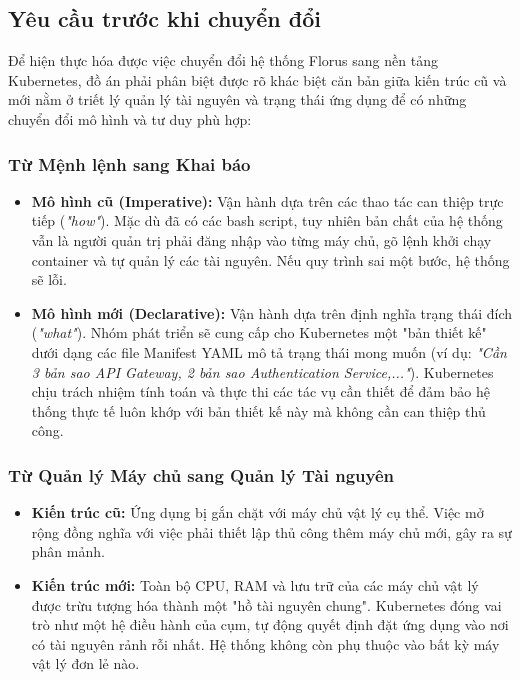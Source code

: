\subsection{Yêu cầu trước khi chuyển đổi}

Để hiện thực hóa được việc chuyển đổi hệ thống Florus sang nền tảng Kubernetes, đồ án phải phân biệt được rõ khác biệt căn bản giữa kiến trúc cũ và mới nằm ở triết lý quản lý tài nguyên và trạng thái ứng dụng để có những chuyển đổi mô hình và tư duy phù hợp:

\subsubsection{Từ Mệnh lệnh sang Khai báo} 
\begin{itemize} 
    \item \textbf{Mô hình cũ (Imperative):} Vận hành dựa trên các thao tác can thiệp trực tiếp (\textit{"how"}). Mặc dù đã có các bash script, tuy nhiên bản chất của hệ thống vẫn là người quản trị phải đăng nhập vào từng máy chủ, gõ lệnh khởi chạy container và tự quản lý các tài nguyên. Nếu quy trình sai một bước, hệ thống sẽ lỗi. 
    \item \textbf{Mô hình mới (Declarative):} Vận hành dựa trên định nghĩa trạng thái đích (\textit{"what"}). Nhóm phát triển sẽ cung cấp cho Kubernetes một "bản thiết kế" dưới dạng các file Manifest YAML mô tả trạng thái mong muốn (ví dụ: \textit{"Cần 3 bản sao API Gateway, 2 bản sao Authentication Service,..."}). Kubernetes chịu trách nhiệm tính toán và thực thi các tác vụ cần thiết để đảm bảo hệ thống thực tế luôn khớp với bản thiết kế này mà không cần can thiệp thủ công. 
\end{itemize}

\subsubsection{Từ Quản lý Máy chủ sang Quản lý Tài nguyên} 
\begin{itemize} 
    \item \textbf{Kiến trúc cũ:} Ứng dụng bị gắn chặt với máy chủ vật lý cụ thể. Việc mở rộng đồng nghĩa với việc phải thiết lập thủ công thêm máy chủ mới, gây ra sự phân mảnh. 
    \item \textbf{Kiến trúc mới:} Toàn bộ CPU, RAM và lưu trữ của các máy chủ vật lý được trừu tượng hóa thành một "hồ tài nguyên chung". Kubernetes đóng vai trò như một hệ điều hành của cụm, tự động quyết định đặt ứng dụng vào nơi có tài nguyên rảnh rỗi nhất. Hệ thống không còn phụ thuộc vào bất kỳ máy vật lý đơn lẻ nào.
\end{itemize}

